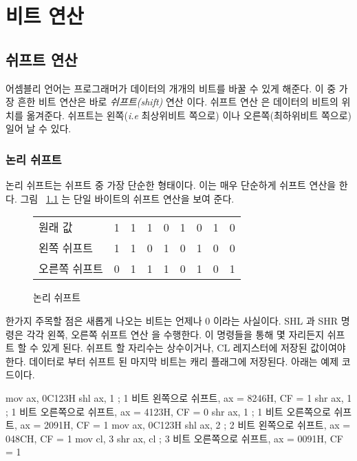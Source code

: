 ﻿%
\chapter{비트 연산}
\section{쉬프트 연산}

어셈블리 언어는 프로그래머가 데이터의 개개의 비트를 바꿀 수 있게 해준다.
이 중 가장 흔한 비트 연산은 바로 \emph{쉬프트(shift)} 연산 이다. 쉬프트 연산
은 데이터의 비트의 위치를 옮겨준다. 쉬프트는 왼쪽(\emph{i.e} 최상위비트 
쪽으로) 이나 오른쪽(최하위비트 쪽으로) 일어 날 수 있다. 

\subsection{논리 쉬프트}

논리 쉬프트는 쉬프트 중 가장 단순한 형태이다. 이는 매우 단순하게 쉬프트
연산을 한다. 그림 ~\ref{fig:logshifts} 는 단일 바이트의 쉬프트 연산을 보여
준다. 

\begin{figure}[h]
\centering
\begin{tabular}{l|c|c|c|c|c|c|c|c|}
\cline{2-9}
원래 값     & 1 & 1 & 1 & 0 & 1 & 0 & 1 & 0 \\
\cline{2-9}
왼쪽 쉬프트  & 1 & 1 & 0 & 1 & 0 & 1 & 0 & 0 \\
\cline{2-9}
오른쪽 쉬프트 & 0 & 1 & 1 & 1 & 0 & 1 & 0 & 1 \\
\cline{2-9}
\end{tabular}
\caption{논리 쉬프트 \label{fig:logshifts}}
\end{figure}

한가지 주목할 점은 새롭게 나오는 비트는 언제나 0 이라는 사실이다. {\code SHL}
 과 {\code SHR}  명령은 각각 왼쪽, 오른쪽 쉬프트 연산
을 수행한다. 이 명령들을 통해 몇 자리든지 쉬프트 할 수 있게 된다. 쉬프트 할 
자리수는 상수이거나, {\code CL} 레지스터에 저장된 값이여야 한다. 데이터로 부터
쉬프트 된 마지막 비트는 캐리 플래그에 저장된다. 아래는 예제 코드이다. 

\begin{AsmCodeListing}[frame=none]
      mov    ax, 0C123H
      shl    ax, 1           ; 1 비트 왼쪽으로 쉬프트,   ax = 8246H, CF = 1
      shr    ax, 1           ; 1 비트 오른쪽으로 쉬프트,  ax = 4123H, CF = 0
      shr    ax, 1           ; 1 비트 오른쪽으로 쉬프트,  ax = 2091H, CF = 1
      mov    ax, 0C123H
      shl    ax, 2           ; 2 비트 왼쪽으로 쉬프트,  ax = 048CH, CF = 1
      mov    cl, 3
      shr    ax, cl          ; 3 비트 오른쪽으로 쉬프트, ax = 0091H, CF = 1
\end{AsmCodeListing}

